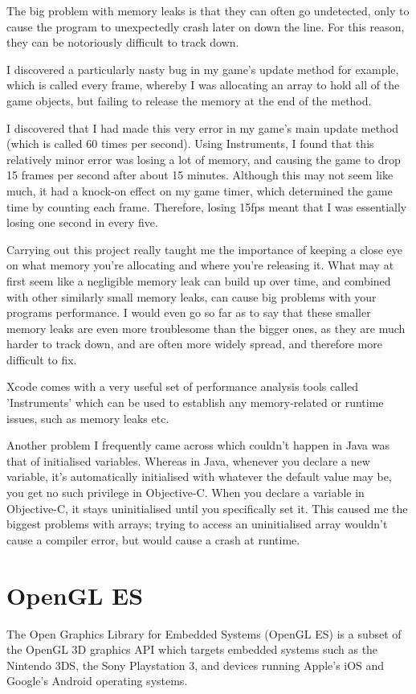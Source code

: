 \documentclass[a4paper,oneside]{report}
\begin{document}
The big problem with memory leaks is that they can often go undetected, only to cause the program to unexpectedly crash later on down the line. For this reason, they can be notoriously difficult to track down. 

I discovered a particularly nasty bug in my game's update method for example, which is called every frame, whereby I was allocating an array to hold all of the game objects, but failing to release the memory at the end of the method. 

I discovered that I had made this very error in my game's main update method (which is called 60 times per second). Using Instruments, I found that this relatively minor error was losing a lot of memory, and causing the game to drop 15 frames per second after about 15 minutes. Although this may not seem like much, it had a knock-on effect on my game timer, which determined the game time by counting each frame. Therefore, losing 15fps meant that I was essentially losing one second in every five. 

Carrying out this project really taught me the importance of keeping a close eye on what memory you're allocating and where you're releasing it. What may at first seem like a negligible memory leak can build up over time, and combined with other similarly small memory leaks, can cause big problems with your programs performance. I would even go so far as to say that these smaller memory leaks are even more troublesome than the bigger ones, as they are much harder to track down, and are often more widely spread, and therefore more difficult to fix.

Xcode comes with a very useful set of performance analysis tools called 'Instruments' which can be used to establish any memory-related or runtime issues, such as memory leaks etc.

Another problem I frequently came across which couldn't happen in Java was that of initialised variables. Whereas in Java, whenever you declare a new variable, it's automatically initialised with whatever the default value may be, you get no such privilege in Objective-C. When you declare a variable in Objective-C, it stays uninitialised until you specifically set it. This caused me the biggest problems with arrays; trying to access an uninitialised array wouldn't cause a compiler error, but would cause a crash at runtime.


\section{OpenGL ES} The Open Graphics Library for Embedded Systems (OpenGL ES) is a subset of the OpenGL 3D graphics API which targets embedded systems such as the Nintendo 3DS, the Sony Playstation 3, and devices running Apple's iOS and Google's Android operating systems.
\end{document}
